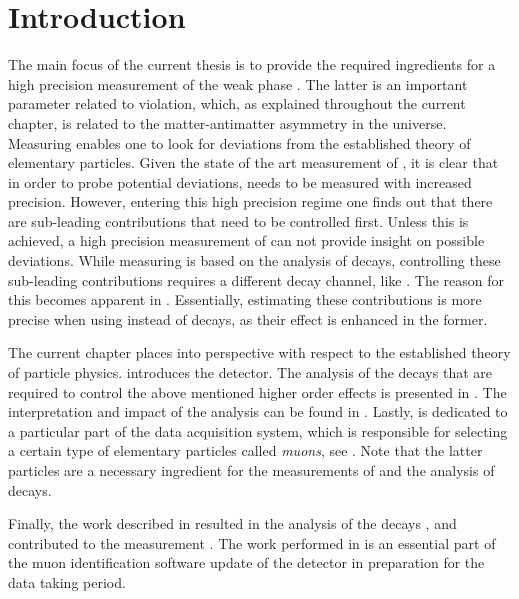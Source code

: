 
\chapter{Introduction}
\label{Introduction}

The main focus of the current thesis is to provide the required ingredients for a high precision measurement of
the weak phase \phis. The latter is an important parameter related to \CP violation, which, as explained throughout
the current chapter, is related to the matter-antimatter asymmetry in the universe. Measuring \phis enables one to look
for deviations from the established theory of elementary particles. Given the state of the art measurement of \phis \cite{phis-3fb-paper},
it is clear that in order to probe potential deviations, \phis needs to be measured with increased precision.
However, entering this high precision regime one finds out that there are sub-leading contributions that need to be
controlled first. Unless this is achieved, a high precision measurement of \phis can not provide insight on possible
deviations. While measuring \phis is based on the analysis of \BsJpsiPhi decays, controlling these sub-leading contributions
requires a different decay channel, like \BsJpsiKst. The reason for this becomes apparent in .
Essentially, estimating these contributions is more precise when using \BsJpsiKst instead of \BsJpsiPhi decays,
as their effect is enhanced in the former.

The current chapter places \phis into perspective with respect to the established theory of particle physics.
 introduces the \lhcb detector. The analysis of the \BsJpsiKst decays that are
required to control the above mentioned higher order effects is presented in .
The interpretation and impact of the analysis can be found in .
Lastly,  is dedicated to a particular part of the \lhcb data acquisition system,
which is responsible for selecting a certain type of elementary particles called {\it muons}, see .
Note that the latter particles are a necessary ingredient for the measurements of \phis and
the analysis of \BsJpsiKst decays.

Finally, the work described in  resulted in the analysis of the \BsJpsiKst
decays \cite{bsjpsikst-paper}, and contributed to the \phis measurement \cite{phis-3fb-paper}.
The work performed in  is an essential part of the muon identification
software update \cite{Albrecht:2253050} of the \lhcb detector in preparation for the \runtwo data taking period.

